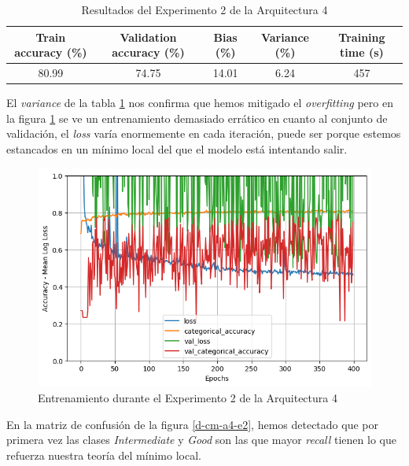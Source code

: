 \documentclass{article}
\begin{document}
			\begin{table}[!h]
				\begin{center}
					\begin{tabular}{| c | c | c | c | c |}
						\textbf{Train accuracy (\%)} & \textbf{Validation accuracy (\%)} & \textbf{Bias (\%)} & \textbf{Variance (\%)} & \textbf{Training time (s)} \\ \hline
						80.99 & 74.75 & 14.01 & 6.24 & 457 \\ \hline
					\end{tabular}
					\caption{Resultados del Experimento 2 de la Arquitectura 4}
					\label{tab:res-d-a4-e2}
				\end{center}
			\end{table}
			
			El \textit{variance} de la tabla \ref{tab:res-d-a4-e2} nos confirma que hemos mitigado el \textit{overfitting} pero en la figura \ref{d-tr-a4-e2} se ve un entrenamiento demasiado err\'atico en cuanto al conjunto de validaci\'on, el \textit{loss} var\'ia enormemente en cada iteraci\'on, puede ser porque estemos estancados en un m\'inimo local del que el modelo est\'a intentando salir.
			\begin{figure}[!h]
				\begin{center}
					\includegraphics[scale=0.5]{d-tr-a4-e2.png}		
					\caption{Entrenamiento durante el Experimento 2 de la Arquitectura 4}	
					\label{d-tr-a4-e2}
				\end{center}
			\end{figure}
			En la matriz de confusi\'on de la figura \ref{d-cm-a4-e2}, hemos detectado que por primera vez las clases \textit{Intermediate} y \textit{Good} son las que mayor \textit{recall} tienen lo que refuerza nuestra teor\'ia del m\'inimo local.
\end{document}
